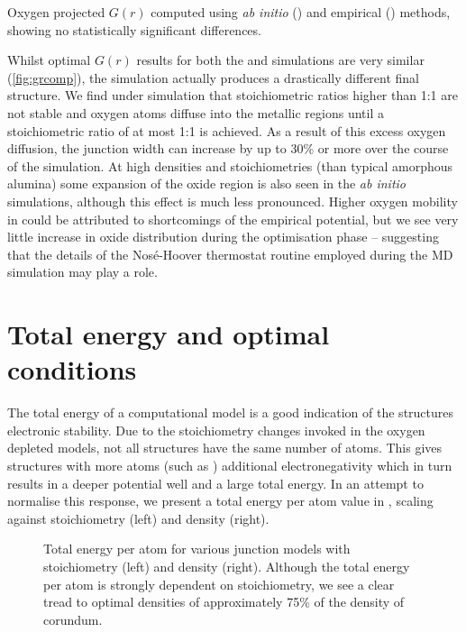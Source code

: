 \phantom{push marginfigure}
\begin{marginfigure}
\resizebox{\marginparwidth}{!}{}
\caption[Radial Distribution Function Comparison]{\label{fig:grcomp}Oxygen projected $G(r)$ computed using \textit{ab initio} ()  and empirical ()  methods, showing no statistically significant differences.}
\end{marginfigure}
\vspace{-1em}
Whilst optimal $G(r)$ results for both the  and  simulations are very similar (\cref{fig:grcomp}), the  simulation actually produces a drastically different final structure.
We find under  simulation that stoichiometric ratios higher than 1:1 are not stable and oxygen atoms diffuse into the metallic regions until a stoichiometric ratio of at most 1:1 is achieved.
As a result of this excess oxygen diffusion, the junction width can increase by up to 30\% or more over the course of the simulation.
At high densities and stoichiometries (than typical amorphous alumina) some expansion of the oxide region is also seen in the \textit{ab initio} simulations, although this effect is much less pronounced.
Higher oxygen mobility in  could be attributed to shortcomings of the empirical potential, but we see very little increase in oxide distribution during the optimisation phase -- suggesting that the details of the Nos\'{e}-Hoover thermostat routine employed during the MD simulation may play a role.

\section{Total energy and optimal conditions}
The total energy of a computational model is a good indication of the structures electronic stability.
Due to the stoichiometry changes invoked in the oxygen depleted models, not all structures have the same number of atoms.
This gives structures with more atoms (such as ) additional electronegativity which in turn results in a deeper potential well and a large total energy.
In an attempt to normalise this response, we present a total energy per atom value in , scaling against stoichiometry (left) and density (right).

\begin{figure}[tbp]
\peratommargins
\begin{adjustwidth}{\peratomleft}{\peratomright}
\resizebox{\widefigure}{!}{}
\caption[Energy Comparisons]{\label{fig:energyperatom}Total energy per atom for various junction models with stoichiometry (left) and density (right).  Although the total energy per atom is strongly dependent on stoichiometry, we see a clear tread to optimal densities of approximately 75\% of the density of corundum.}
\end{adjustwidth}
\end{figure}

